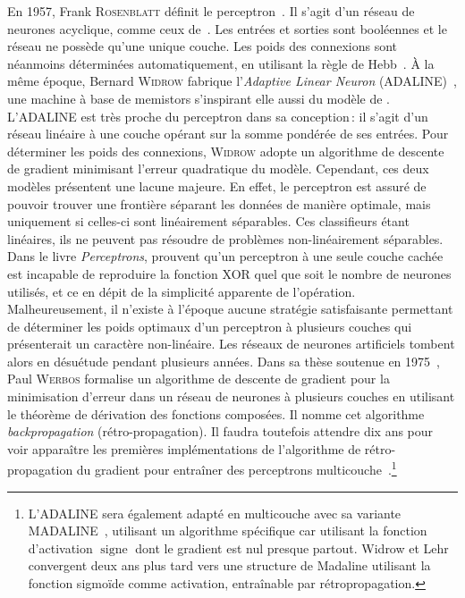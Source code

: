En 1957, Frank \textsc{Rosenblatt} définit le perceptron~\cite{rosenblatt_perceptron_1957}. Il s'agit d'un réseau de neurones acyclique, comme ceux de~\citet{mcculloch_logical_1943}. Les entrées et sorties sont booléennes et le réseau ne possède qu'une unique couche. Les poids des connexions sont néanmoins déterminées automatiquement, en utilisant la règle de Hebb~\cite{hebb_organization_1949}.
À la même époque, Bernard \textsc{Widrow} fabrique l'\emph{Adaptive Linear Neuron} (ADALINE)~\cite{widrow_adaptive_1960}, une machine à base de memistors s'inspirant elle aussi du modèle de \citeauthor{mcculloch_logical_1943}. L'ADALINE est très proche du perceptron dans sa conception\,: il s'agit d'un réseau linéaire à une couche opérant sur la somme pondérée de ses entrées. Pour déterminer les poids des connexions, \textsc{Widrow} adopte un algorithme de descente de gradient minimisant l'erreur quadratique du modèle.
Cependant, ces deux modèles présentent une lacune majeure. En effet, le perceptron est assuré de pouvoir trouver une frontière séparant les données de manière optimale, mais uniquement si celles-ci sont linéairement séparables. Ces classifieurs étant linéaires, ils ne peuvent pas résoudre de problèmes non-linéairement séparables. Dans le livre \emph{Perceptrons}, \citet{minsky_perceptrons_1969} prouvent qu'un perceptron à une seule couche cachée est incapable de reproduire la fonction XOR quel que soit le nombre de neurones utilisés, et ce en dépit de la simplicité apparente de l'opération. Malheureusement, il n'existe à l'époque aucune stratégie satisfaisante permettant de déterminer les poids optimaux d'un perceptron à plusieurs couches qui présenterait un caractère non-linéaire. Les réseaux de neurones artificiels tombent alors en désuétude pendant plusieurs années.
Dans sa thèse soutenue en 1975~\cite{werbos_beyond_1975}, Paul \textsc{Werbos} formalise un algorithme de descente de gradient pour la minimisation d'erreur dans un réseau de neurones à plusieurs couches en utilisant le théorème de dérivation des fonctions composées. Il nomme cet algorithme \emph{backpropagation} (rétro-propagation). Il faudra toutefois attendre dix ans pour voir apparaître les premières implémentations de l'algorithme de rétro-propagation du gradient pour entraîner des perceptrons multicouche~\cite{rumelhart_learning_1986,lecun_learning_1986}.\footnote{L'ADALINE sera également adapté en multicouche avec sa variante MADALINE~\cite{winter_madaline_1988}, utilisant un algorithme spécifique car utilisant la fonction d'activation $\operatorname{signe}$ dont le gradient est nul presque partout. Widrow et Lehr convergent deux ans plus tard vers une structure de Madaline utilisant la fonction sigmoïde comme activation, entraînable par rétropropagation.}

